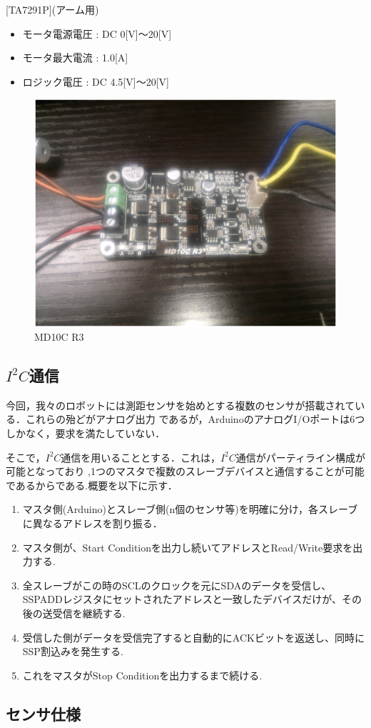 \documentclass[10pt,a4j]{jarticle}
\begin{document}
[TA7291P](アーム用)
\begin{itemize}
 \item モータ電源電圧 : DC 0[V]$〜$20[V]
 \item モータ最大電流 : 1.0[A]
 \item ロジック電圧 : DC 4.5[V]$〜$20[V]
\end{itemize}
\begin{figure}[b]
 \centering
 \includegraphics[width=0.5\hsize]{./picture/MD10C.eps}
    \caption{MD10C R3}
    \label{MD10C}
\end{figure}

\subsection{$I^2 C$通信}
今回，我々のロボットには測距センサを始めとする複数のセンサが搭載されている．これらの殆どがアナログ出力
であるが，ArduinoのアナログI/Oポートは6つしかなく，要求を満たしていない．

そこで，$I^2 C$通信を用いることとする．これは，$I^2 C$通信がパーティライン構成が可能となっており
,1つのマスタで複数のスレーブデバイスと通信することが可能であるからである.概要を以下に示す．
\begin{enumerate}
 \item マスタ側(Arduino)とスレーブ側(n個のセンサ等)を明確に分け，各スレーブに異なるアドレスを割り振る．
 \item マスタ側が、Start Conditionを出力し続いてアドレスとRead/Write要求を出力する.
 \item 全スレーブがこの時のSCLのクロックを元にSDAのデータを受信し、SSPADDレジスタにセットされたアドレスと一致したデバイスだけが、その後の送受信を継続する.
 \item 受信した側がデータを受信完了すると自動的にACKビットを返送し、同時にSSP割込みを発生する.
 \item これをマスタがStop Conditionを出力するまで続ける.
\end{enumerate}

\subsection{センサ仕様}
\end{document}
